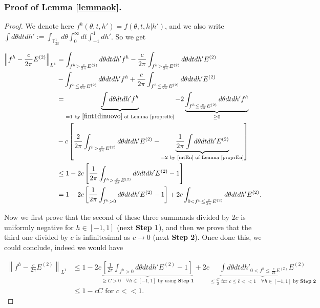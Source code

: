 \documentclass[a4paper,10pt,reqno]{amsart}
\numberwithin{equation}{subsection}
\numberwithin{figure}{subsection}
\begin{document}
\subsubsection{Proof of Lemma \ref{lemmaok}.}
\begin{proof} We denote here $f^h(\theta,t,h')=f(\theta,t,h|h')$, and we also write $\int d\theta dtdh':=\int_{\mathbb{T}^1_{2\pi}}d\theta\int_0^{\infty}dt\int_{-1}^1dh'$. So we get

{\small\begin{align*}
\left\|f^h-\frac{c}{2\pi}E^{(2)}\right\|_{L^1}&=\int_{f^h>\frac{c}{2\pi}E^{(2)}}d\theta dtdh' f^h-\frac{c}{2\pi}\int_{f^h>\frac{c}{2\pi}E^{(2)}}d\theta dtdh' E^{(2)}
\\
&-\int_{f^h\leq\frac{c}{2\pi}E^{(2)}}d\theta dtdh' f^h+\frac{c}{2\pi}\int_{f^h\leq\frac{c}{2\pi}E^{(2)}}d\theta dtdh' E^{(2)}
\\
&=\underbrace{\int d\theta dtdh' f^h}_{=1\textrm{ by }\eqref{fint1dinuovo}\textrm{ of Lemma \ref{propreffe}}}-2\underbrace{\int_{f^h\leq\frac{c}{2\pi}E^{(2)}}d\theta dtdh' f^h}_{\geq0}
\\
&-c\left[\frac{2}{2\pi}\int_{f^h>\frac{c}{2\pi}E^{(2)}}d\theta dtdh' E^{(2)}-\underbrace{\frac{1}{2\pi}\int d\theta dtdh' E^{(2)}}_{=2\textrm{  by \eqref{intEn} of Lemma \ref{proprEn}}}\right]
\\
&\leq1-2c\left[\frac{1}{2\pi}\int_{f^h>\frac{c}{2\pi}E^{(2)}}d\theta dtdh' E^{(2)}-1\right]
\\
&=1-2c\left[\frac{1}{2\pi}\int_{f^h>0}d\theta dtdh' E^{(2)}-1\right]+2c\int_{0<f^h\leq\frac{c}{2\pi}E^{(2)}} d\theta dtdh' E^{(2)}.
\end{align*}}

Now we first prove that the second of these three summands divided by $2c$ is uniformly negative for $h\in[-1,1]$ (next \textbf{Step 1}), and then we prove that the third one divided by $c$ is infinitesimal as $c\to0$ (next \textbf{Step 2}). Once done this, we could conclude, indeed we would have

{\scriptsize\begin{align}
\label{anteconclusione}\left\|f^h-\frac{c}{2\pi}E^{(2)}\right\|_{L^1}&\leq1-2c\underbrace{\left[\frac{1}{2\pi}\int_{f^h>0}d\theta dtdh' E^{(2)}-1\right]}_{\geq C>0\quad\forall h\in[-1,1]\textrm{ by using }\textbf{Step 1}}+2c\underbrace{\int d\theta dtdh'_{0<f^h\leq\frac{c}{2\pi}E^{(2)}}E^{(2)}}_{\leq\frac{C}{2}\textrm{ for }c\leq\bar c<<1\quad\forall h\in[-1,1]\textrm{ by }\textbf{Step 2}}
\\
\label{conclusione}&\leq1-cC\textrm{ for }c<<1.
\end{align}}


\end{proof}
\end{document}
